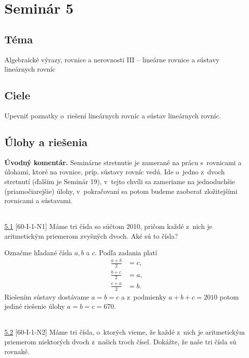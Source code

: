 \section*{Seminár 5}
\subsection*{Téma}
Algebraické výrazy, rovnice a nerovnosti III -- lineárne rovnice a sústavy lineárnych rovníc

\subsection*{Ciele}
Upevniť poznatky o~riešení lineárnych rovníc a sústav lineárnych rovníc.

\subsection*{Úlohy a riešenia}

\textbf{Úvodný komentár.} Seminárne stretnutie je zamerané na prácu s~rovnicami a úlohami, ktoré na rovnice, príp. sústavy rovníc vedú. Ide o~jedno z~dvoch stretnutí (ďalším je Seminár 19), v~tejto chvíli sa zameriame na jednoduchšie (priamočiarejšie) úlohy, v~pokračovaní sa potom budeme zaoberať zložitejšími rovnicami a sústavami.\\
\\
\begin{tcolorbox}[breakable,notitle,boxrule=0pt,colback=light-gray,colframe=light-gray]\ul{5.1} [60-I-1-N1] Máme tri čísla so súčtom 2010, pričom každé z~nich je aritmetickým priemerom zvyšných dvoch. Aké sú to čísla?

\end{tcolorbox}

\rie Označme hľadané čísla $a,b$ a $c$. Podľa zadania platí
\begin{align*}
\frac{a+b}{2} &=c,\\
\frac{b+c}{2} &=a,\\
\frac{c+a}{2} &=b.
\end{align*}
Riešením sústavy dostávame $a=b=c$ a z~podmienky $a+b+c=2010$ potom jediné riešenie úlohy $a=b=c=670$.\\
\\
\begin{tcolorbox}[breakable,notitle,boxrule=0pt,colback=light-gray,colframe=light-gray]\ul{5.2} [60-I-1-N2] Máme tri čísla, o~ktorých vieme, že každé z~nich je aritmetickým priemerom niektorých dvoch z~našich troch čísel. Dokážte, že naše tri čísla sú rovnaké.

\end{tcolorbox}

